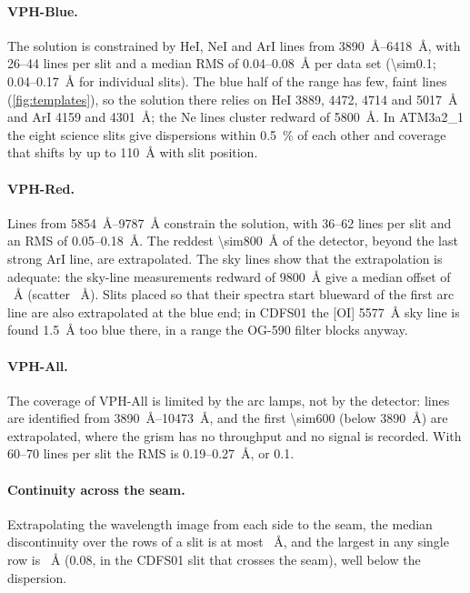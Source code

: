\documentclass[11pt,a4paper]{article}
\begin{document}
\paragraph{VPH-Blue.} The solution is constrained by HeI, NeI and ArI lines from
\SIrange{3890}{6418}{\angstrom}, with 26--44 lines per slit and a median RMS of
0.04--0.08~\AA{} per data set (\SI{\sim0.1}{\pixel}; 0.04--0.17~\AA{} for individual
slits). The blue half of the range has few, faint
lines (\cref{fig:templates}), so the solution there relies on HeI 3889, 4472,
4714 and 5017~\AA{} and ArI 4159 and 4301~\AA; the Ne lines cluster redward of
\SI{5800}{\angstrom}. In ATM3a2\_1 the eight science slits give dispersions within
\SI{0.5}{\percent} of each other and coverage that shifts by up to
\SI{110}{\angstrom} with slit position.

\paragraph{VPH-Red.} Lines from \SIrange{5854}{9787}{\angstrom} constrain the
solution, with 36--62 lines per slit and an RMS of 0.05--0.18~\AA. The reddest
\SI{\sim800}{\angstrom} of the detector, beyond the last strong ArI line, are
extrapolated. The sky lines show that the extrapolation is adequate: the
\skyRedEndN{} sky-line measurements redward of \SI{9800}{\angstrom} give a median
offset of \skyRedEndMedian~\AA{} (scatter \skyRedEndStd~\AA). Slits placed so
that their spectra start blueward of the first arc line are also extrapolated at
the blue end; in CDFS01 the [OI] \SI{5577}{\angstrom} sky line is found
\SI{1.5}{\angstrom} too blue there, in a range the OG-590 filter blocks anyway.

\paragraph{VPH-All.} The coverage of VPH-All is limited by the arc lamps, not by
the detector: lines are identified from \SIrange{3890}{10473}{\angstrom}, and the
first \SI{\sim600}{\pixel} (below \SI{3890}{\angstrom}) are extrapolated, where
the grism has no throughput and no signal is recorded. With 60--70 lines per slit
the RMS is 0.19--0.27~\AA, or \SI{0.1}{\pixel}.

\paragraph{Continuity across the seam.} Extrapolating the wavelength image from each
side to the seam, the median discontinuity over the rows of a slit is at most
\seamWaveJump~\AA, and the largest in any single row is \seamWaveJumpRowMax~\AA{}
(\SI{0.08}{\pixel}, in the CDFS01 slit that crosses the seam), well below the
dispersion.
\end{document}
